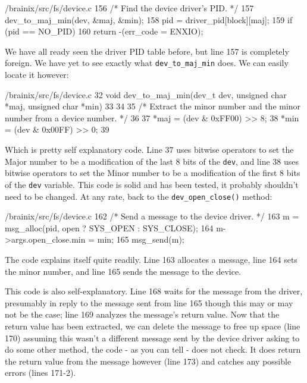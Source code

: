 \begin{code}{/brainix/src/fs/device.c}
156      /* Find the device driver's PID. */
157      dev_to_maj_min(dev, &maj, &min);
158      pid = driver_pid[block][maj];
159      if (pid == NO_PID)
160           return -(err_code = ENXIO);
\end{code} 
We have all ready seen the driver PID table before, but line 157 is completely foreign. We have yet to see exactly what \verb|dev_to_maj_min| does. We can easily locate it however:
\begin{code}{/brainix/src/fs/device.c}
32 void dev_to_maj_min(dev_t dev, unsigned char *maj, unsigned char *min)
33 {
34 
35 /* Extract the minor number and the minor number from a device number. */
36 
37      *maj = (dev & 0xFF00) >> 8;
38      *min = (dev & 0x00FF) >> 0;
39 }
\end{code}
Which is pretty self explanatory code. Line 37 uses bitwise operators to set the Major number to be a modification of the last 8 bits of the \verb|dev|, and line 38 uses bitwise operators to set the Minor number to be a modification of the first 8 bits of the \verb|dev| variable. This code is solid and has been tested, it probably shouldn't need to be changed. At any rate, back to the \verb|dev_open_close()| method:
\begin{code}{/brainix/src/fs/device.c}
162      /* Send a message to the device driver. */
163      m = msg_alloc(pid, open ? SYS_OPEN : SYS_CLOSE);
164      m->args.open_close.min = min;
165      msg_send(m);
\end{code}
The code explains itself quite readily. Line 163 allocates a message, line 164 sets the minor number, and line 165 sends the message to the device.
\begin{code}{/brainix/src/fs/device.c}
167      /* Await the device driver's reply. */
168      m = msg_receive(pid);
169      ret_val = m->args.open_close.ret_val;
170      msg_free(m);
171      if (ret_val < 0)
172           err_code = -ret_val;
173      return ret_val;
174 }
\end{code}
This code is also self-explanatory. Line 168 waits for the message from the driver, presumably in reply to the message sent from line 165 though this may or may not be the case; line 169 analyzes the message's return value. Now that the return value has been extracted, we can delete the message to free up space (line 170) assuming this wasn't a different message sent by the device driver asking to do some other method, the code - as you can tell - does not check. It does return the return value from the message however (line 173) and catches any possible errors (lines 171-2).

